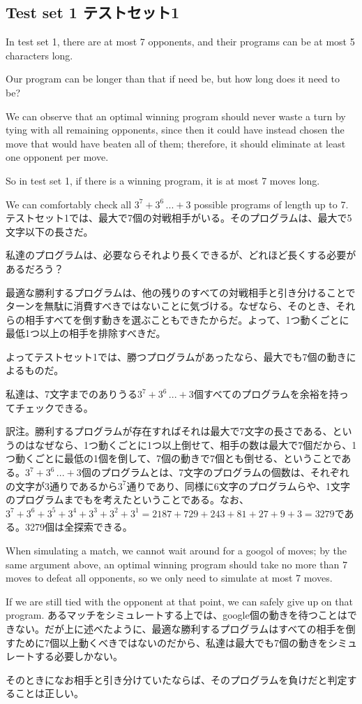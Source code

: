 \documentclass[uplatex,dvipdfmx]{jsarticle} \usepackage{amsmath,amssymb,bm}
\begin{document}
\subsection*{Test set 1 テストセット1}
\begin{paracol}{2}
In test set 1, there are at most 7 opponents, and their programs can be at most 5 characters long.

Our program can be longer than that if need be, but how long does it need to be?

We can observe that an optimal winning program should never waste a turn by tying with all remaining opponents, since then it could have instead chosen the move that would have beaten all of them; therefore, it should eliminate at least one opponent per move.

So in test set 1, if there is a winning program, it is at most 7 moves long.

We can comfortably check all $3^7 + 3^6\,... + 3$ possible programs of length up to 7.
\switchcolumn
テストセット1では、最大で7個の対戦相手がいる。そのプログラムは、最大で5文字以下の長さだ。

私達のプログラムは、必要ならそれより長くできるが、どれほど長くする必要があるだろう？

最適な勝利するプログラムは、他の残りのすべての対戦相手と引き分けることでターンを無駄に消費すべきではないことに気づける。なぜなら、そのとき、それらの相手すべてを倒す動きを選ぶこともできたからだ。よって、1つ動くごとに最低1つ以上の相手を排除すべきだ。

よってテストセット1では、勝つプログラムがあったなら、最大でも7個の動きによるものだ。

私達は、7文字までのありうる$3^7 + 3^6\,... + 3$個すべてのプログラムを余裕を持ってチェックできる。
\end{paracol}
\vspace{\baselineskip}
訳注。勝利するプログラムが存在すればそれは最大で7文字の長さである、というのはなぜなら、1つ動くごとに1つ以上倒せて、相手の数は最大で7個だから、1つ動くごとに最低の1個を倒して、7個の動きで7個とも倒せる、ということである。$3^7 + 3^6\,... + 3$個のプログラムとは、7文字のプログラムの個数は、それぞれの文字が3通りであるから$3^7$通りであり、同様に6文字のプログラムらや、1文字のプログラムまでもを考えたということである。なお、$3^7+3^6+3^5+3^4+3^3+3^2+3^1=2187+729+243+81+27+9+3=3279$である。3279個は全探索できる。
\vspace{\baselineskip}
\begin{paracol}{2}
When simulating a match, we cannot wait around for a googol of moves; by the same argument above, an optimal winning program should take no more than 7 moves to defeat all opponents, so we only need to simulate at most 7 moves.

If we are still tied with the opponent at that point, we can safely give up on that program.
\switchcolumn
あるマッチをシミュレートする上では、google個の動きを待つことはできない。だが上に述べたように、最適な勝利するプログラムはすべての相手を倒すために7個以上動くべきではないのだから、私達は最大でも7個の動きをシミュレートする必要しかない。

そのときになお相手と引き分けていたならば、そのプログラムを負けだと判定することは正しい。
\end{paracol}
\end{document}
